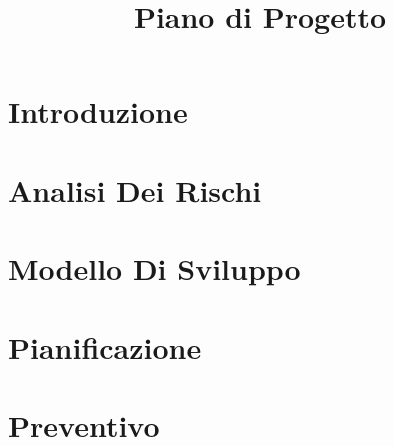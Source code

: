 \documentclass{classes/base}
\title{Piano di Progetto}
\author{\ruth}
\begin{document}
	\maketitle
	\newpage
	
	\tableofcontents
	\newpage
	\section{Introduzione}
	
	
    \newpage
	\section{Analisi Dei Rischi}
	
	\newpage

	\section{Modello Di Sviluppo}
	

	\newpage
	\section{Pianificazione}
	

	\newpage
	\section{Preventivo}
	
	
\end{document}
